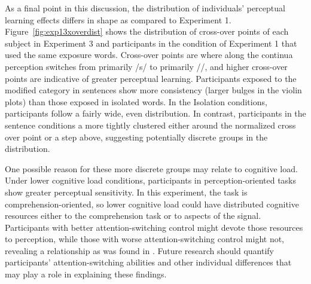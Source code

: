 As a final point in this discussion, the distribution of individuals' perceptual learning effects differs in shape as compared to Experiment 1. 
Figure~\ref{fig:exp13xoverdist} shows the distribution of cross-over points of each subject in Experiment 3 and participants in the condition of Experiment 1 that used the same exposure words.  
Cross-over points are where along the continua perception switches from primarily /s/ to primarily /\textesh/, and higher cross-over points are indicative of greater perceptual learning.
Participants exposed to the modified category in sentences show more consistency (larger bulges in the violin plots) than those exposed in isolated words.
In the Isolation conditions, participants follow a fairly wide, even distribution.
In contrast, participants in the sentence conditions a more tightly clustered either around the normalized cross over point or a step above, suggesting potentially discrete groups in the distribution.

One possible reason for these more discrete groups may relate to cognitive load.
Under lower cognitive load conditions, participants in perception-oriented tasks show greater perceptual sensitivity.
In this experiment, the task is comprehension-oriented, so lower cognitive load could have distributed cognitive resources either to the comprehension task or to aspects of the signal.
Participants with better attention-switching control might devote those resources to perception, while those with worse attention-switching control might not, revealing a relationship as was found in \citet{Scharenborg2013}.
Future research should quantify participants' attention-switching abilities and other individual differences that may play a role in explaining these findings.



